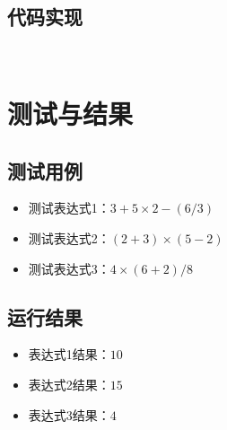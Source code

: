 \documentclass[UTF8]{ctexart}
\begin{document}
\subsection{代码实现}
\begin{lstlisting}
    
\end{lstlisting}
\section{测试与结果}
\subsection{测试用例}
\begin{itemize}
    \item 测试表达式1：$3 + 5 \times 2 - ( 6 / 3 )$
    \item 测试表达式2：$( 2 + 3 ) \times ( 5 - 2 )$
    \item 测试表达式3：$4 \times ( 6 + 2 ) / 8$
\end{itemize}

\subsection{运行结果}
\begin{itemize}
    \item 表达式1结果：$10$
    \item 表达式2结果：$15$
    \item 表达式3结果：$4$
\end{itemize}
\end{document}
